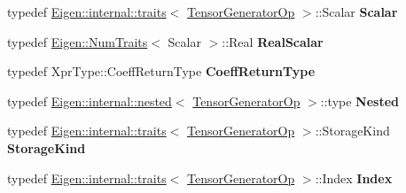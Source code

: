 \begin{DoxyCompactItemize}
typedef \hyperlink{struct_eigen_1_1internal_1_1traits}{Eigen\+::internal\+::traits}$<$ \hyperlink{class_eigen_1_1_tensor_generator_op}{Tensor\+Generator\+Op} $>$\+::Scalar {\bfseries Scalar}
\item 
\mbox{\label{class_eigen_1_1_tensor_generator_op_a822b9443893bfa4a378a9d34adacf34a}} 
typedef \hyperlink{group___core___module_struct_eigen_1_1_num_traits}{Eigen\+::\+Num\+Traits}$<$ Scalar $>$\+::Real {\bfseries Real\+Scalar}
\item 
\mbox{\label{class_eigen_1_1_tensor_generator_op_a91201747e1d2988041b45ec75082ec7d}} 
typedef Xpr\+Type\+::\+Coeff\+Return\+Type {\bfseries Coeff\+Return\+Type}
\item 
\mbox{\label{class_eigen_1_1_tensor_generator_op_a80e0e20573c1fc49b64ad5d59ef72c8d}} 
typedef \hyperlink{struct_eigen_1_1internal_1_1nested}{Eigen\+::internal\+::nested}$<$ \hyperlink{class_eigen_1_1_tensor_generator_op}{Tensor\+Generator\+Op} $>$\+::type {\bfseries Nested}
\item 
\mbox{\label{class_eigen_1_1_tensor_generator_op_a2a24490610861d9c571ad86f1ae5cbb0}} 
typedef \hyperlink{struct_eigen_1_1internal_1_1traits}{Eigen\+::internal\+::traits}$<$ \hyperlink{class_eigen_1_1_tensor_generator_op}{Tensor\+Generator\+Op} $>$\+::Storage\+Kind {\bfseries Storage\+Kind}
\item 
\mbox{\label{class_eigen_1_1_tensor_generator_op_a95421d232cdafb894710e78ecb1a2b8a}} 
typedef \hyperlink{struct_eigen_1_1internal_1_1traits}{Eigen\+::internal\+::traits}$<$ \hyperlink{class_eigen_1_1_tensor_generator_op}{Tensor\+Generator\+Op} $>$\+::Index {\bfseries Index}
\end{DoxyCompactItemize}
